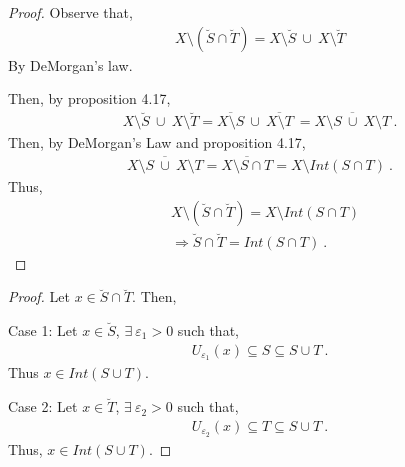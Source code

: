 \begin{questions}


\begin{solution}
  \begin{proof}
 Observe that,
\begin{align*}
X \setminus  (\breve{S} \cap \breve{T}) = X \setminus \breve{S} ~\cup ~X \setminus \breve{T}
\end{align*} 
 By DeMorgan's law. 
 
 Then, by proposition 4.17,
 \begin{align*}
X \setminus \breve{S} ~\cup ~X \setminus \breve{T} = \overline{X \setminus S}~\cup~\overline{X \setminus T}~ = \overline{X \setminus S~\cup~X \setminus T }~.
 \end{align*}
 Then, by DeMorgan's Law and proposition 4.17,
 \begin{align*}
 \overline{X \setminus S~\cup~X \setminus T } = \overline{X \setminus S \cap T} = X \setminus Int(S \cap T)~.
 \end{align*}
 Thus,
 \begin{align*}
 &X \setminus  (\breve{S} \cap \breve{T}) = X \setminus Int(S \cap T)
 \\
 & \Rightarrow \breve{S} \cap \breve{T} = Int(S \cap T)~.
 \end{align*}
  \end{proof} 
\end{solution}


\begin{solution}
  \begin{proof}
  
Let $x \in  \breve{S} \cap \breve{T}$. Then,

Case 1: Let $x \in \breve{S}$, $\exists~ \varepsilon_1>0$ such that,
\begin{align*}
U_{\varepsilon_1}(x) \subseteq S \subseteq S \cup T~.
\end{align*}
Thus $x \in Int(S \cup T)$.
\vspace{5mm}

Case 2: Let $x \in \breve{T}$, $\exists~ \varepsilon_2>0$ such that,
\begin{align*}
U_{\varepsilon_2}(x) \subseteq T \subseteq S \cup T~.
\end{align*}
Thus, $x \in Int(S \cup T)$.
\vspace{5mm}


\end{proof}
\end{solution}
\end{questions}
